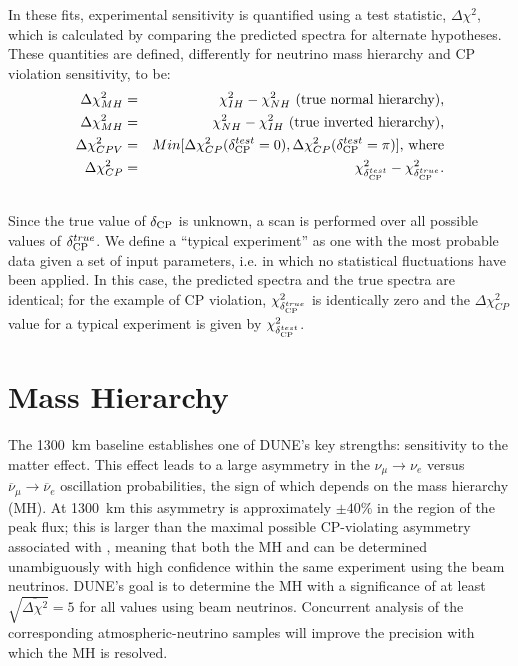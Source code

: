 In these fits, experimental sensitivity is
quantified using a test statistic, $\Delta\chi^2$, which is calculated
by comparing the predicted spectra for alternate hypotheses.
These quantities are defined, differently for neutrino mass hierarchy
and CP violation sensitivity, to be:
\begin{eqnarray}
\Delta\chi^2_{MH} & = & \chi^2_{IH} - \chi^2_{NH}\textrm{ (true normal hierarchy),}\label{eq:dx2_MH}\\ 
\Delta\chi^2_{MH} & = & \chi^2_{NH} - \chi^2_{IH}\textrm{ (true inverted hierarchy),}\\
\Delta\chi^2_{CPV} & = & Min[\Delta\chi^2_{CP}(\mdeltacp^{test}=0),\Delta\chi^2_{CP}(\mdeltacp^{test}=\pi)]\textrm{, where} \\
\Delta\chi^2_{CP} & = & \chi^2_{\mdeltacp^{test}} - \chi^2_{\mdeltacp^{true}}.\label{eq:dx2_CP} \\ \nonumber
\end{eqnarray}
Since the true value of $\mdeltacp$ is unknown, a scan is  performed over
all possible values of $\mdeltacp^{true}$. 
We define a ``typical experiment'' as one with the most probable data given a set of input parameters, 
i.e. in which no statistical fluctuations have been applied.
In this case, the predicted spectra and the true spectra are identical;
for the example of CP violation, $\chi^2_{\mdeltacp^{true}}$ 
is identically zero and the $\Delta\chi^2_{CP}$ value for a typical experiment is given by 
$\chi^2_{\mdeltacp^{test}}$.

\section{Mass Hierarchy}
\label{sec:physics-lbnosc-mh}

The 1300~km baseline establishes one of DUNE's key strengths: sensitivity to the matter
effect. This effect leads to a large asymmetry in the
$\nu_\mu\to \nu_e$ versus $\overline{\nu}_\mu \to \overline{\nu}_e$
oscillation probabilities, the sign of which depends on the mass
hierarchy (MH).  At 1300~km this asymmetry is approximately
$\pm 40\%$ in the region of the peak flux; this is larger than the
maximal possible CP-violating asymmetry associated with \deltacp,
meaning that both the MH and \deltacp can be
determined unambiguously with high confidence within the same
experiment using the beam neutrinos.  DUNE's goal is to determine the MH with a significance of at least $\sqrt{\overline{\Delta\chi^{2}}} = 5$ for all \deltacp values using beam neutrinos.  Concurrent analysis of the corresponding atmospheric-neutrino samples will improve the precision with which the
MH is resolved. 

